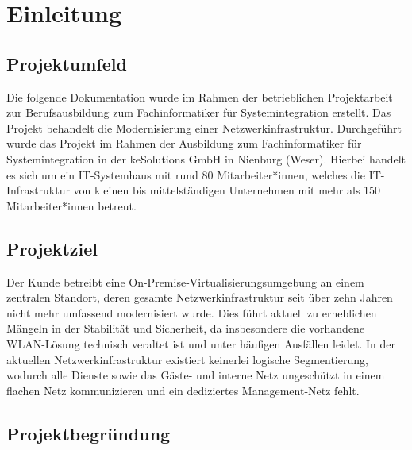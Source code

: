 \section{Einleitung}
\label{sec:Einleitung}


\subsection{Projektumfeld} 
\label{sec:Projektumfeld}
Die folgende Dokumentation wurde im Rahmen der betrieblichen Projektarbeit zur 
Berufsausbildung zum Fachinformatiker für Systemintegration erstellt. Das Projekt behandelt 
die Modernisierung einer Netzwerkinfrastruktur. Durchgeführt wurde das 
Projekt im Rahmen der Ausbildung zum Fachinformatiker für Systemintegration in der 
keSolutions GmbH in Nienburg (Weser). Hierbei handelt es sich um ein IT-Systemhaus mit 
rund 80 Mitarbeiter*innen, welches die IT-Infrastruktur von kleinen bis mittelständigen
Unternehmen mit mehr als 150 Mitarbeiter*innen betreut.

\subsection{Projektziel} 
\label{sec:Projektziel}
Der Kunde betreibt eine On-Premise-Virtualisierungsumgebung an einem zentralen Standort, 
deren gesamte Netzwerkinfrastruktur seit über zehn Jahren nicht mehr umfassend modernisiert wurde. 
Dies führt aktuell zu erheblichen Mängeln in der Stabilität und Sicherheit, 
da insbesondere die vorhandene WLAN-Lösung technisch veraltet ist und unter häufigen Ausfällen 
leidet. In der aktuellen Netzwerkinfrastruktur existiert keinerlei logische Segmentierung, 
wodurch alle Dienste sowie das Gäste- und interne Netz ungeschützt in einem flachen Netz kommunizieren und ein dediziertes Management-Netz fehlt.


\subsection{Projektbegründung} 
\label{sec:Projektbegruendung}


